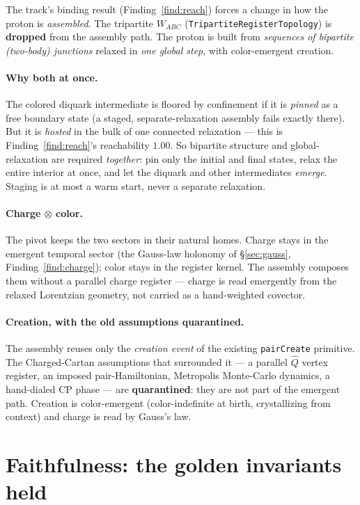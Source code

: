 \documentclass[11pt]{article}
\theoremstyle{definition}
\newcommand{\code}[1]{\texttt{#1}}
\begin{document}
The track's binding result (Finding~\ref{find:reach}) forces a change in how the proton is
\emph{assembled}. The tripartite $W_{ABC}$ (\code{TripartiteRegisterTopology}) is
\textbf{dropped} from the assembly path. The proton is built from \emph{sequences of
bipartite (two-body) junctions} relaxed in \emph{one global step}, with color-emergent
creation.

\paragraph{Why both at once.} The colored diquark intermediate is floored by confinement if
it is \emph{pinned} as a free boundary state (a staged, separate-relaxation assembly fails
exactly there). But it is \emph{hosted} in the bulk of one connected relaxation --- this is
Finding~\ref{find:reach}'s reachability $1.00$. So bipartite structure and
global-relaxation are required \emph{together}: pin only the initial and final states,
relax the entire interior at once, and let the diquark and other intermediates
\emph{emerge}. Staging is at most a warm start, never a separate relaxation.

\paragraph{Charge $\otimes$ color.} The pivot keeps the two sectors in their natural homes.
Charge stays in the emergent temporal sector (the Gauss-law holonomy of
\S\ref{sec:gauss}, Finding~\ref{find:charge}); color stays in the register kernel. The
assembly composes them without a parallel charge register --- charge is read emergently
from the relaxed Lorentzian geometry, not carried as a hand-weighted covector.

\paragraph{Creation, with the old assumptions quarantined.} The assembly reuses only the
\emph{creation event} of the existing \code{pairCreate} primitive. The Charged-Cartan
assumptions that surrounded it --- a parallel $\hat Q$ vertex register, an imposed
pair-Hamiltonian, Metropolis Monte-Carlo dynamics, a hand-dialed CP phase --- are
\textbf{quarantined}: they are not part of the emergent path. Creation is color-emergent
(color-indefinite at birth, crystallizing from context) and charge is read by Gauss's law.

\section{Faithfulness: the golden invariants held}
\label{sec:faithful}
\end{document}
